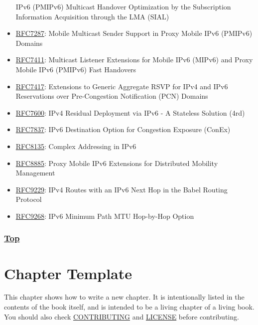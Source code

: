 \documentclass[
]{article}
\begin{document}
\begin{itemize}
  IPv6 (PMIPv6) Multicast Handover Optimization by the Subscription
  Information Acquisition through the LMA (SIAL)
\item
  \href{https://www.rfc-editor.org/info/rfc7287}{RFC7287}: Mobile
  Multicast Sender Support in Proxy Mobile IPv6 (PMIPv6) Domains
\item
  \href{https://www.rfc-editor.org/info/rfc7411}{RFC7411}: Multicast
  Listener Extensions for Mobile IPv6 (MIPv6) and Proxy Mobile IPv6
  (PMIPv6) Fast Handovers
\item
  \href{https://www.rfc-editor.org/info/rfc7417}{RFC7417}: Extensions to
  Generic Aggregate RSVP for IPv4 and IPv6 Reservations over
  Pre-Congestion Notification (PCN) Domains
\item
  \href{https://www.rfc-editor.org/info/rfc7600}{RFC7600}: IPv4 Residual
  Deployment via IPv6 - A Stateless Solution (4rd)
\item
  \href{https://www.rfc-editor.org/info/rfc7837}{RFC7837}: IPv6
  Destination Option for Congestion Exposure (ConEx)
\item
  \href{https://www.rfc-editor.org/info/rfc8135}{RFC8135}: Complex
  Addressing in IPv6
\item
  \href{https://www.rfc-editor.org/info/rfc8885}{RFC8885}: Proxy Mobile
  IPv6 Extensions for Distributed Mobility Management
\item
  \href{https://www.rfc-editor.org/info/rfc9229}{RFC9229}: IPv4 Routes
  with an IPv6 Next Hop in the Babel Routing Protocol
\item
  \href{https://www.rfc-editor.org/info/rfc9268}{RFC9268}: IPv6 Minimum
  Path MTU Hop-by-Hop Option
\end{itemize}

\subsubsection{\texorpdfstring{\hyperref[further-reading]{Top}}{Top}}\label{top-2}

\pagebreak

\section{Chapter Template}\label{chapter-template}

This chapter shows how to write a new chapter. It is intentionally
listed in the contents of the book itself, and is intended to be a
living chapter of a living book. You should also check
\href{https://github.com/becarpenter/book6/blob/main/CONTRIBUTING.md}{CONTRIBUTING}
and
\href{https://github.com/becarpenter/book6/blob/main/LICENSE.md}{LICENSE}
before contributing.
\end{document}
